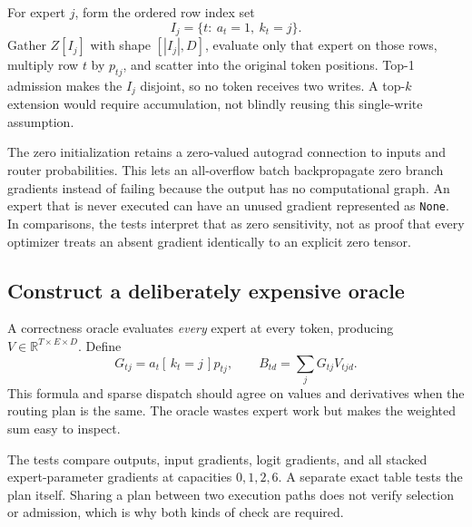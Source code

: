 For expert $j$, form the ordered row index set
\begin{equation}
I_j=\{t:\ a_t=1,\ k_t=j\}.
\end{equation}
Gather $Z[I_j]$ with shape $[|I_j|,D]$, evaluate only that expert on those rows,
multiply row $t$ by $p_{tj}$, and scatter into the original token positions.
Top-1 admission makes the $I_j$ disjoint, so no token receives two writes.
A top-$k$ extension would require accumulation, not blindly reusing this
single-write assumption.


The zero initialization retains a zero-valued autograd connection to inputs and
router probabilities. This lets an all-overflow batch backpropagate zero branch
gradients instead of failing because the output has no computational graph.
An expert that is never executed can have an unused gradient represented as
\texttt{None}. In comparisons, the tests interpret that as zero sensitivity,
not as proof that every optimizer treats an absent gradient identically to an
explicit zero tensor.

\subsection{Construct a deliberately expensive oracle}
A correctness oracle evaluates \emph{every} expert at every token, producing
$V\in\mathbb R^{T\times E\times D}$. Define
\begin{equation}
G_{tj}=a_t[\,k_t=j\,]p_{tj},\qquad
B_{td}=\sum_j G_{tj}V_{tjd}. \label{eq:denseoracle}
\end{equation}
This formula and sparse dispatch should agree on values and derivatives when
the routing plan is the same. The oracle wastes expert work but makes the
weighted sum easy to inspect.

The tests compare outputs, input gradients, logit gradients, and all stacked
expert-parameter gradients at capacities $0,1,2,6$. A separate exact table tests
the plan itself. Sharing a plan between two execution paths does not verify
selection or admission, which is why both kinds of check are required.


